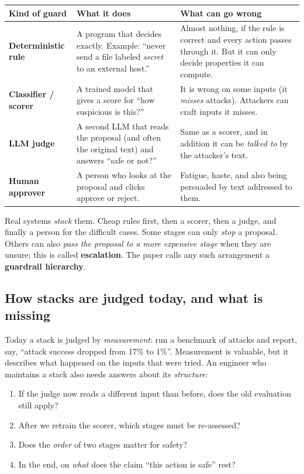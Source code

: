 \begin{center}
\renewcommand{\arraystretch}{1.25}
\begin{tabularx}{\textwidth}{@{}p{3.1cm}XX@{}}
\toprule
\textbf{Kind of guard} & \textbf{What it does} & \textbf{What can go wrong}\\
\midrule
\textcolor{tintblue}{\textbf{Deterministic rule}} & A program that decides exactly. Example: ``never send a file labeled \emph{secret} to an external host.'' & Almost nothing, if the rule is correct and every action passes through it. But it can only decide properties it can compute.\\[3pt]
\textcolor{tintteal}{\textbf{Classifier / scorer}} & A trained model that gives a score for ``how suspicious is this?'' & It is wrong on some inputs (it \emph{misses} attacks). Attackers can craft inputs it misses.\\[3pt]
\textcolor{tintorange}{\textbf{LLM judge}} & A second LLM that reads the proposal (and often the original text) and answers ``safe or not?'' & Same as a scorer, and in addition it can be \emph{talked to} by the attacker's text.\\[3pt]
\textcolor{tintpurple}{\textbf{Human approver}} & A person who looks at the proposal and clicks approve or reject. & Fatigue, haste, and also being persuaded by text addressed to them.\\
\bottomrule
\end{tabularx}
\end{center}

Real systems \emph{stack} them. Cheap rules first, then a scorer, then a judge, and finally a person for the difficult cases. Some stages can only \emph{stop} a proposal. Others can also \emph{pass the proposal to a more expensive stage} when they are unsure; this is called \textbf{escalation}. The paper calls any such arrangement a \textbf{guardrail hierarchy}.

\subsection{How stacks are judged today, and what is missing}

Today a stack is judged by \emph{measurement}: run a benchmark of attacks and report, say, ``attack success dropped from 17\% to 1\%''. Measurement is valuable, but it describes what happened on the inputs that were tried. An engineer who maintains a stack also needs answers about its \emph{structure}:

\begin{enumerate}
\item If the judge now reads a different input than before, does the old evaluation still apply?
\item After we retrain the scorer, which stages must be re-assessed?
\item Does the \emph{order} of two stages matter for safety?
\item In the end, on \emph{what} does the claim ``this action is safe'' rest?
\end{enumerate}

